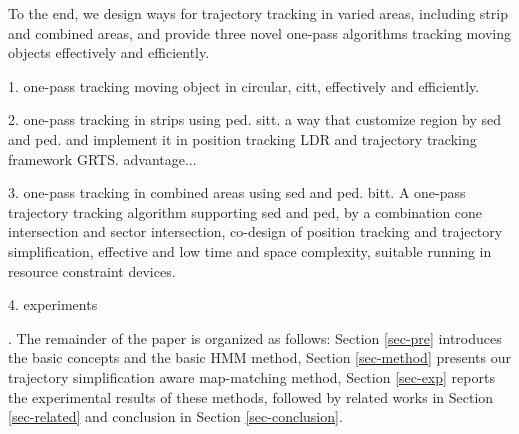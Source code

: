 To the end, we design ways for trajectory tracking in varied areas, including strip and combined areas, and provide three novel one-pass algorithms tracking moving objects effectively and efficiently. 

1. one-pass tracking moving object in circular, citt, effectively and efficiently.

2. one-pass tracking in strips using ped. sitt.
a way that customize region by sed and ped. and implement it in position tracking LDR and trajectory tracking framework GRTS. advantage...

3. one-pass tracking in combined areas using sed and ped. bitt.  
A one-pass trajectory tracking algorithm supporting sed and ped, by a combination cone intersection and sector intersection, \ie co-design of position tracking and trajectory simplification, effective and low time and space complexity, suitable running in resource constraint devices.

4. experiments

.
The remainder of the paper is organized as follows:
Section \ref{sec-pre} introduces the basic concepts and the basic HMM method,
Section \ref{sec-method} presents our trajectory simplification aware map-matching method,
Section \ref{sec-exp} reports the experimental results of these methods, followed by related works in Section \ref{sec-related} and conclusion in Section \ref{sec-conclusion}.



